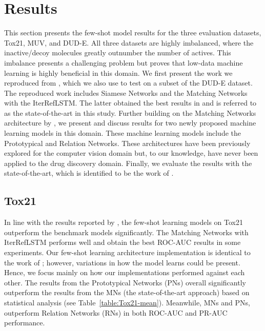 \section{Results}

This section presents the few-shot model results for the three evaluation datasets, Tox21, MUV, and DUD-E. All three datasets are highly imbalanced, where the inactive/decoy molecules greatly outnumber the number of actives. This imbalance presents a challenging problem but proves that low-data machine learning is highly beneficial in this domain. We first present the work we reproduced from \citet{altae2017low}, which we also use to test on a subset of the DUD-E dataset. The reproduced work includes Siamese Networks \citep{koch2015siamese} and the Matching Networks \citep{vinyals2016matching} with the IterRefLSTM. The latter obtained the best results in \citet{altae2017low} and is referred to as the state-of-the-art in this study. Further building on the Matching Networks architecture by \citet{vinyals2016matching}, we present and discuss results for two newly proposed machine learning models in this domain. These machine learning models include the Prototypical \citep{snell2017prototypical} and Relation \citep{sung2018learning} Networks. These architectures have been previously explored for the computer vision domain but, to our knowledge, have never been applied to the drug discovery domain. Finally, we evaluate the results with the state-of-the-art, which is identified to be the work of \citet{altae2017low}.


\subsection{Tox21}

In line with the results reported by \citet{altae2017low}, the few-shot learning models on Tox21 outperform the benchmark models significantly. The Matching Networks with IterRefLSTM performs well and obtain the best ROC-AUC results in some experiments. Our few-shot learning architecture implementation is identical to the work of \citet{altae2017low}; however, variations in how the model learns could be present. Hence, we focus mainly on how our implementations performed against each other. The results from the Prototypical Networks (PNs) overall significantly outperform the results from the MNs (the state-of-the-art approach) based on statistical analysis (see Table~\ref{table:Tox21-mean}). Meanwhile, MNs and PNs, outperform Relation Networks (RNs) in both ROC-AUC and PR-AUC performance. 

